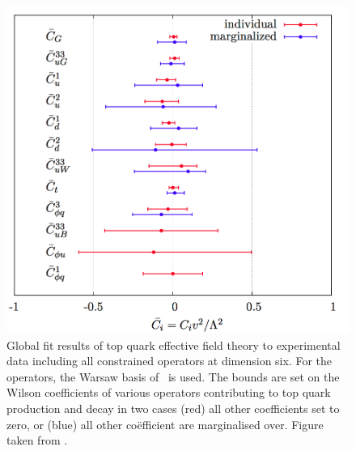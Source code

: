 \begin{figure}[htbp]
	\centering
	\includegraphics[width=1.0\linewidth]{1_Introduction/Figures/anomlouscouplings}
	\caption{Global fit results of top quark effective field theory to experimental data including all constrained operators at dimension six. For the operators, the Warsaw basis of~\cite{Grzadkowski:2010es} is used. The bounds are set on the Wilson coefficients of various operators contributing to top quark production and decay in two cases (red) all other coefficients set to zero, or (blue) all other co\"efficient are marginalised over. Figure taken from \cite{Buckley:2015lku}. }
	\label{fig:anomlouscouplings}
\end{figure}



